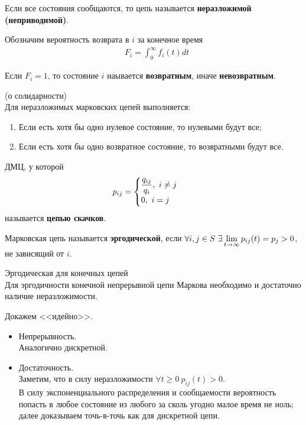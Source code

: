\begin{Def}
    Если все состояния сообщаются, то цепь называется \textbf{неразложимой
      (неприводимой)}.
\end{Def}
\begin{Des}
    Обозначим вероятность возврата в $i$ за конечное время
    \begin{align*}
      & F_i = \int_0^{\infty}f_i (t)dt
    \end{align*}
\end{Des}
\begin{Def}
    Если $F_i = 1$, то состояние $i$ наывается \textbf{возвратным}, иначе
    \textbf{невозвратным}.
\end{Def}
\begin{theorem} (о солидарности)
    \\
    Для неразложимых марковских цепей выполняется:
    \begin{enumerate}
        \item Если есть хотя бы одно нулевое состояние, то нулевыми будут все;
        \item Если есть хотя бы одно возвратное состояние, то возвратными будут
        все.
    \end{enumerate}
\end{theorem}
\begin{Def}
    ДМЦ, у которой
    \begin{align*}
      & p_{ij} = \begin{cases}
          \displaystyle \frac{q_{ij}}{q_i}, \ i \neq j \\
          0, \ i = j
          \end{cases}
    \end{align*}
    называется \textbf{цепью скачков}.
\end{Def}
\begin{Def}
    Марковская цепь называется \textbf{эргодической}, если $\forall i,j \in S \
    \exists \displaystyle \lim_{t\to \infty}p_{ij}(t) = p_j > 0$, не зависящий от $i$.
\end{Def}
\begin{theorem} Эргодическая для конечных цепей
    \\
    Для эргодичности конечной непрерывной цепи Маркова необходимо и достаточно
    наличие неразложимости.
\end{theorem}
\begin{Proof}
    Докажем <<идейно>>.
    \begin{itemize}
        \item Непрерывность.
        \\
        Аналогично дискретной.
        \item Достаточность.
        \\
        Заметим, что в силу неразложимости $\forall t \geq 0 \ p_{ij}(t)>0$.
        \\
        В силу экспоненциального распределения и сообщаемости вероятность
        попасть в любое состояние из любого за сколь угодно малое время не ноль;
        далее доказываем точь-в-точь как для дискретной цепи.
    \end{itemize}
\end{Proof}
